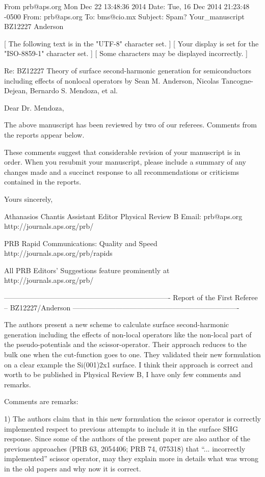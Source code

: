 From prb@aps.org Mon Dec 22 13:48:36 2014
Date: Tue, 16 Dec 2014 21:23:48 -0500
From: prb@aps.org
To: bms@cio.mx
Subject: {Spam?} Your_manuscript BZ12227 Anderson

    [ The following text is in the "UTF-8" character set. ]
    [ Your display is set for the "ISO-8859-1" character set.  ]
    [ Some characters may be displayed incorrectly. ]

Re: BZ12227
    Theory of surface second-harmonic generation for  semiconductors
    including effects of nonlocal operators
    by Sean M. Anderson, Nicolas Tancogne-Dejean, Bernardo S. Mendoza, et
    al.

Dear Dr. Mendoza,

The above manuscript has been reviewed by two of our referees. Comments
from the reports appear below.

These comments suggest that considerable revision of your manuscript is
in order. When you resubmit your manuscript, please include a summary
of any changes made and a succinct response to all recommendations or
criticisms contained in the reports.

Yours sincerely,

Athanasios Chantis
Assistant Editor
Physical Review B
Email: prb@aps.org
http://journals.aps.org/prb/

PRB Rapid Communications: Quality and Speed
http://journals.aps.org/prb/rapids

All PRB Editors' Suggestions feature prominently at
http://journals.aps.org/prb/

----------------------------------------------------------------------
Report of the First Referee -- BZ12227/Anderson
----------------------------------------------------------------------

The authors present a new scheme to calculate surface second-harmonic 
generation including the effects of non-local operators like the 
non-local part of the pseudo-potentials and the scissor-operator. 
Their approach reduces to the bulk one when the cut-function goes to 
one. They validated their new formulation on a clear example the 
Si(001)2x1 surface. I think their approach is correct and worth to be 
published in Physical Review B, I have only few comments and remarks. 

Comments are remarks: 

1) The authors claim that in this new formulation the scissor operator 
is correctly implemented respect to previous attempts to include it in 
the surface SHG response. Since some of the authors of the present 
paper are also author of the previous approaches (PRB 63, 2054406; PRB 
74, 075318) that “... incorrectly implemented” scissor operator, may 
they explain more in details what was wrong in the old papers and why 
now it is correct. 

